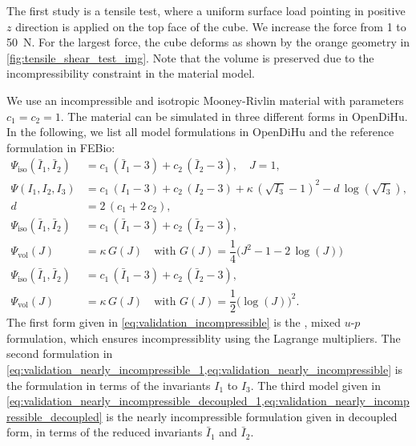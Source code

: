 The first study is a tensile test, where a uniform surface load pointing in positive $z$ direction is applied on the top face of the cube. We increase the force from 1 to \SI{50}{\newton}. For the largest force, the cube deforms as shown by the orange geometry in \cref{fig:tensile_shear_test_img}. Note that the volume is preserved due to the incompressibility constraint in the material model.

We use an incompressible and isotropic Mooney-Rivlin material with parameters $c_1=c_2=1$. The material can be simulated in three different forms in OpenDiHu. In the following, we list all model formulations in OpenDiHu and the reference formulation in FEBio:
%
\begin{subequations}\label{eq:validation_1}
  \begin{align}
      \Psi_\text{iso}(\bar{I}_1,\bar{I}_2) &= c_1\,(\bar{I}_1 - 3) + c_2\,(\bar{I}_2 - 3), \quad J=1, \label{eq:validation_incompressible}\\[4mm]
      \Psi(I_1,I_2,I_3) &= c_1\,(I_1 - 3) + c_2\,(I_2 - 3) + \kappa\,(\sqrt{I_3} - 1)^2 - d\,\log(\sqrt{I_3}),\label{eq:validation_nearly_incompressible_1} \\
       d &= 2\,(c_1 + 2\,c_2) \label{eq:validation_nearly_incompressible}, \\[4mm]
      \Psi_\text{iso}(\bar{I}_1,\bar{I}_2) &= c_1\,(\bar{I}_1 - 3) + c_2\,(\bar{I}_2 - 3),\label{eq:validation_nearly_incompressible_decoupled_1} \\ 
      \Psi_\text{vol}(J) &= \kappa\,G(J) \quad\text{with }  G(J) = \dfrac14\big(J^2 - 1 - 2\,\log(J)\big) \label{eq:validation_nearly_incompressible_decoupled} \\[4mm]
      \Psi_\text{iso}(\bar{I}_1,\bar{I}_2) &= c_1\,(\bar{I}_1 - 3) + c_2\,(\bar{I}_2 - 3),\label{eq:validation_nearly_incompressible_decoupled_febio_1} \\ 
      \Psi_\text{vol}(J) &= \kappa\,G(J) \quad\text{with } G(J) = \dfrac12\big(\log(J)\big)^2 \label{eq:validation_nearly_incompressible_decoupled_febio}.
  \end{align}
\end{subequations}
%
The first form given in \cref{eq:validation_incompressible} is the , mixed $u$-$p$ formulation, which ensures incompressiblity using the Lagrange multipliers. The second formulation in \cref{eq:validation_nearly_incompressible_1,eq:validation_nearly_incompressible} is the  formulation in terms of the invariants $I_1$ to $I_3$. The third model given in \cref{eq:validation_nearly_incompressible_decoupled_1,eq:validation_nearly_incompressible_decoupled} is the nearly incompressible formulation given in decoupled form, in terms of the reduced invariants $\bar{I}_1$ and $\bar{I}_2$.
